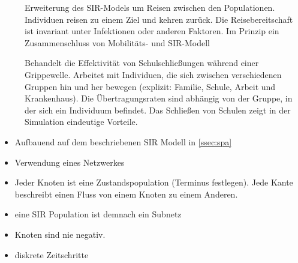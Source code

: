 \steffen
\begin{description}
	\item[\cite{Sattenspiel1995}] Erweiterung des SIR-Models um Reisen zwischen den Populationen. Individuen reisen zu einem Ziel und kehren zurück. Die Reisebereitschaft ist invariant unter Infektionen oder anderen Faktoren. Im Prinzip ein Zusammenschluss von Mobilitäts- und SIR-Modell
	\item[\cite{Capasso1978}] Behandelt die Effektivität von Schulschließungen während einer Grippewelle. Arbeitet mit Individuen, die sich zwischen verschiedenen Gruppen hin und her bewegen (explizit: Familie, Schule, Arbeit und Krankenhaus). Die Übertragungsraten sind abhängig von der Gruppe, in der sich ein Individuum befindet. Das Schließen von Schulen zeigt in der Simulation eindeutige Vorteile.
\end{description}

\begin{itemize}
	\item Aufbauend auf dem beschriebenen SIR Modell in \ref{ssec:spa}
	\item Verwendung eines Netzwerkes
	\item Jeder Knoten ist eine Zustandspopulation (Terminus festlegen). Jede Kante beschreibt einen Fluss von einem Knoten zu einem Anderen.
	\item eine SIR Population ist demnach ein Subnetz
	\item Knoten sind nie negativ. 
	\item diskrete Zeitschritte
\end{itemize}